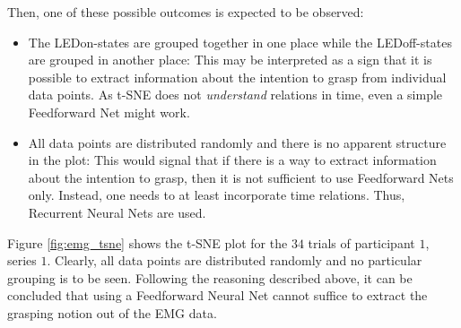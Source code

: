 \documentclass{article} %
\begin{document}
Then, one of these possible outcomes is expected to be observed:
\begin{itemize}
	\item The LEDon-states are grouped together in one place while the LEDoff-states are grouped in another place:
	This may be interpreted as a sign that it is possible to extract information about the intention to grasp from individual data points. As t-SNE does not \emph{understand} relations in time, even a simple Feedforward Net might work.
	\item All data points are distributed randomly and there is no apparent structure in the plot:
	This would signal that if there is a way to extract information about the intention to grasp, then it is not sufficient to use Feedforward Nets only. Instead, one needs to at least incorporate time relations. Thus, Recurrent Neural Nets are used.
\end{itemize}
Figure \ref{fig:emg_tsne} shows the t-SNE plot for the $34$ trials of participant $1$, series $1$. Clearly, all data points are distributed randomly and no particular grouping is to be seen. Following the reasoning described above, it can be concluded that using a Feedforward Neural Net cannot suffice to extract the grasping notion out of the EMG data.
\end{document}

